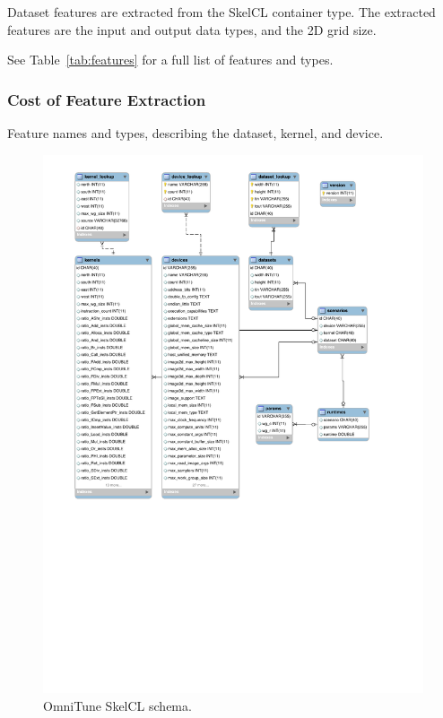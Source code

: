 Dataset features are extracted from the SkelCL container type. The
extracted features are the input and output data types, and the 2D
grid size.

See Table~\ref{tab:features} for a full list of features and
types.

\subsubsection{Cost of Feature Extraction}


\begin{table}

\caption{Feature names and types, describing the dataset, kernel,
  and device.}
\label{tab:features}
\end{table}


\begin{figure}
\centering
\includegraphics[width=\textwidth]{img/omnitune-data-schema.pdf}
\caption{%
  OmniTune SkelCL schema.%
}
\label{fig:omnitune-system-flow}
\end{figure}


